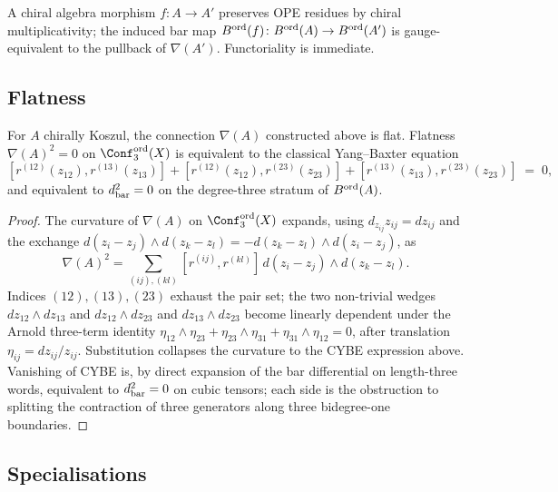 A chiral algebra morphism \(f\colon A \to A'\) preserves OPE residues
by chiral multiplicativity; the induced bar map
\(B^{\mathrm{ord}}(f)\colon B^{\mathrm{ord}}(A) \to B^{\mathrm{ord}}(A')\) is gauge-equivalent to the
pullback of \(\nabla(A')\). Functoriality is immediate.

\subsection{Flatness}

\begin{proposition}[Arnold flatness \(\Leftrightarrow\) CYBE \(\Leftrightarrow\) \(\dbar^{2} = 0\)]
\label{prop:arnold-flatness-equiv}
\ClaimStatusProvedHere
For \(A\) chirally Koszul, the connection \(\nabla(A)\) constructed
above is flat. Flatness \(\nabla(A)^{2} = 0\) on
\(\Conf_{3}^{\mathrm{ord}}(X)\) is equivalent to the classical
Yang--Baxter equation
\[
  [r^{(12)}(z_{12}), r^{(13)}(z_{13})]
  + [r^{(12)}(z_{12}), r^{(23)}(z_{23})]
  + [r^{(13)}(z_{13}), r^{(23)}(z_{23})]
  \;=\; 0,
\]
and equivalent to \(\dbar^{2} = 0\) on the degree-three stratum of
\(B^{\mathrm{ord}}(A)\).
\end{proposition}

\begin{proof}
The curvature of \(\nabla(A)\) on \(\Conf_{3}^{\mathrm{ord}}(X)\)
expands, using \(d_{z_{ij}} z_{ij} = dz_{ij}\) and the exchange
\(d(z_{i}-z_{j}) \wedge d(z_{k}-z_{l}) = - d(z_{k}-z_{l}) \wedge d(z_{i}-z_{j})\), as
\[
  \nabla(A)^{2} = \sum_{(ij),(kl)} [r^{(ij)}, r^{(kl)}]\,
     d(z_{i}-z_{j}) \wedge d(z_{k}-z_{l}).
\]
Indices \((12), (13), (23)\) exhaust the pair set; the two non-trivial
wedges \(dz_{12} \wedge dz_{13}\) and \(dz_{12} \wedge dz_{23}\) and
\(dz_{13} \wedge dz_{23}\) become linearly dependent under the Arnold
three-term identity
\(\eta_{12}\wedge\eta_{23} + \eta_{23}\wedge\eta_{31} + \eta_{31}\wedge\eta_{12} = 0\),
after translation \(\eta_{ij} = dz_{ij}/z_{ij}\). Substitution collapses
the curvature to the CYBE expression above. Vanishing of CYBE is, by
direct expansion of the bar differential on length-three words,
equivalent to \(\dbar^{2} = 0\) on cubic tensors; each side is the
obstruction to splitting the contraction of three generators along
three bidegree-one boundaries.
\end{proof}

\subsection{Specialisations}

